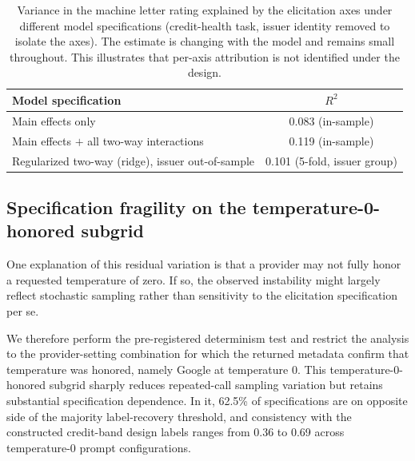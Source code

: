 \documentclass[a4paper,fleqn]{cas-sc}
\begin{document}
\begin{table}[t]\centering
\caption{Variance in the machine letter rating explained by the elicitation axes under different model
specifications (credit-health task, issuer identity removed to isolate the axes). The estimate is changing
with the model and remains small throughout. This illustrates that per-axis attribution is not identified under the design.}
\label{tab:varrange}
\begin{tabular}{lc}\toprule
Model specification & $R^2$ \\\midrule
Main effects only & 0.083 (in-sample) \\
Main effects $+$ all two-way interactions & 0.119 (in-sample) \\
Regularized two-way (ridge), issuer out-of-sample & 0.101 (5-fold, issuer group) \\\bottomrule
\end{tabular}\end{table}

\subsection{Specification fragility on the temperature-0-honored subgrid}
One explanation of this residual variation is that a provider may not fully honor a requested
temperature of zero. If so, the observed instability might largely reflect stochastic sampling rather
than sensitivity to the elicitation specification per se.

We therefore perform the pre-registered determinism test and restrict the analysis to the
provider-setting combination for which the returned metadata confirm that temperature was honored, namely Google
at temperature 0. This temperature-0-honored subgrid sharply reduces repeated-call sampling variation but
retains substantial specification dependence. In it, 62.5\% of specifications are on opposite side of the majority
label-recovery threshold, and consistency with the constructed credit-band design labels ranges from 0.36 to
0.69 across temperature-0 prompt configurations.
\end{document}

